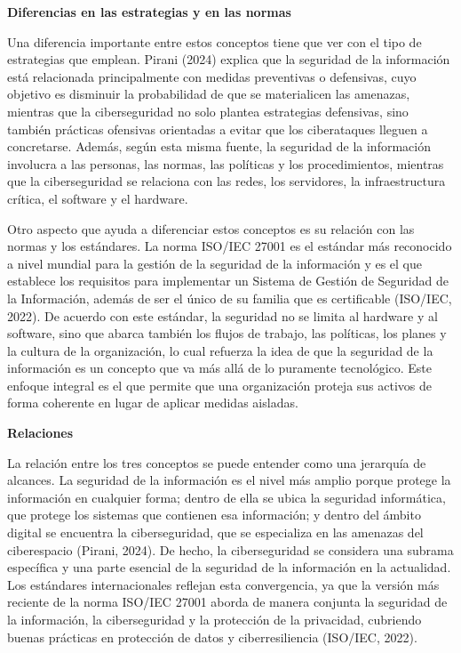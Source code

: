 \documentclass[12pt,letterpaper]{article}
\newcommand{\subtitulo}[1]{\vspace{12pt}\noindent\textbf{#1}\par\vspace{10pt}}
\begin{document}
\subtitulo{Diferencias en las estrategias y en las normas}
Una diferencia importante entre estos conceptos tiene que ver con el tipo de estrategias que emplean. Pirani (2024) explica que la seguridad de la información está relacionada principalmente con medidas preventivas o defensivas, cuyo objetivo es disminuir la probabilidad de que se materialicen las amenazas, mientras que la ciberseguridad no solo plantea estrategias defensivas, sino también prácticas ofensivas orientadas a evitar que los ciberataques lleguen a concretarse. Además, según esta misma fuente, la seguridad de la información involucra a las personas, las normas, las políticas y los procedimientos, mientras que la ciberseguridad se relaciona con las redes, los servidores, la infraestructura crítica, el software y el hardware.

Otro aspecto que ayuda a diferenciar estos conceptos es su relación con las normas y los estándares. La norma ISO/IEC 27001 es el estándar más reconocido a nivel mundial para la gestión de la seguridad de la información y es el que establece los requisitos para implementar un Sistema de Gestión de Seguridad de la Información, además de ser el único de su familia que es certificable (ISO/IEC, 2022). De acuerdo con este estándar, la seguridad no se limita al hardware y al software, sino que abarca también los flujos de trabajo, las políticas, los planes y la cultura de la organización, lo cual refuerza la idea de que la seguridad de la información es un concepto que va más allá de lo puramente tecnológico. Este enfoque integral es el que permite que una organización proteja sus activos de forma coherente en lugar de aplicar medidas aisladas.

\subtitulo{Relaciones}
La relación entre los tres conceptos se puede entender como una jerarquía de alcances. La seguridad de la información es el nivel más amplio porque protege la información en cualquier forma; dentro de ella se ubica la seguridad informática, que protege los sistemas que contienen esa información; y dentro del ámbito digital se encuentra la ciberseguridad, que se especializa en las amenazas del ciberespacio (Pirani, 2024). De hecho, la ciberseguridad se considera una subrama específica y una parte esencial de la seguridad de la información en la actualidad. Los estándares internacionales reflejan esta convergencia, ya que la versión más reciente de la norma ISO/IEC 27001 aborda de manera conjunta la seguridad de la información, la ciberseguridad y la protección de la privacidad, cubriendo buenas prácticas en protección de datos y ciberresiliencia (ISO/IEC, 2022).
\end{document}
